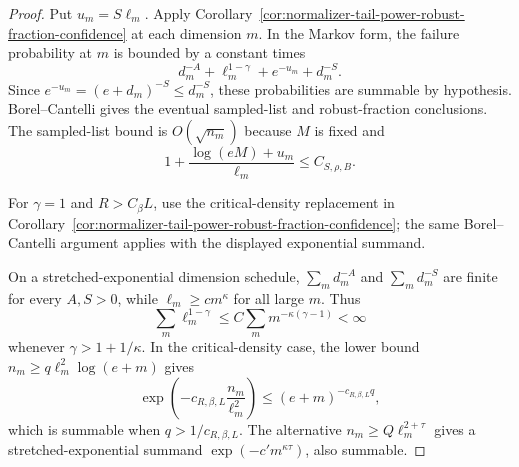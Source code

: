 \documentclass[11pt]{amsart}
\numberwithin{equation}{section}
\theoremstyle{definition}
\theoremstyle{remark}
\begin{document}
\begin{proof}
Put \(u_m=S\ell_m\).  Apply
Corollary~\ref{cor:normalizer-tail-power-robust-fraction-confidence} at each
dimension \(m\).  In the Markov form, the failure probability at \(m\) is bounded
by a constant times
\[
  d_m^{-A}+\ell_m^{1-\gamma}+e^{-u_m}+d_m^{-S}.
\]
Since \(e^{-u_m}=(e+d_m)^{-S}\le d_m^{-S}\), these probabilities are summable by
hypothesis.  Borel--Cantelli gives the eventual sampled-list and robust-fraction
conclusions.  The sampled-list bound is \(O(\sqrt{n_m})\) because \(M\) is fixed
and
\[
  1+\frac{\log(eM)+u_m}{\ell_m}
  \le C_{S,\rho,B}.
\]

For \(\gamma=1\) and \(R>C_\beta L\), use the critical-density replacement in
Corollary~\ref{cor:normalizer-tail-power-robust-fraction-confidence}; the same
Borel--Cantelli argument applies with the displayed exponential summand.

On a stretched-exponential dimension schedule, \(\sum_m d_m^{-A}\) and
\(\sum_m d_m^{-S}\) are finite for every \(A,S>0\), while
\(\ell_m\ge c m^\kappa\) for all large \(m\).  Thus
\[
  \sum_m \ell_m^{1-\gamma}
  \le C\sum_m m^{-\kappa(\gamma-1)}<\infty
\]
whenever \(\gamma>1+1/\kappa\).  In the critical-density case, the lower bound
\(n_m\ge q\ell_m^2\log(e+m)\) gives
\[
  \exp\left(-c_{R,\beta,L}\frac{n_m}{\ell_m^2}\right)
  \le (e+m)^{-c_{R,\beta,L}q},
\]
which is summable when \(q>1/c_{R,\beta,L}\).  The alternative
\(n_m\ge Q\ell_m^{2+\tau}\) gives a stretched-exponential summand
\(\exp(-c'm^{\kappa\tau})\), also summable.
\end{proof}
\end{document}
